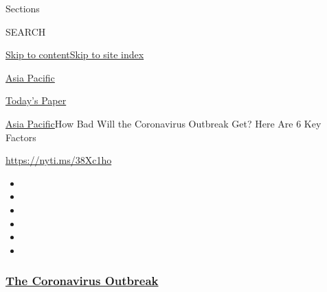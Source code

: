Sections

SEARCH

\protect\hyperlink{site-content}{Skip to
content}\protect\hyperlink{site-index}{Skip to site index}

\href{https://www.nytimes3xbfgragh.onion/section/world/asia}{Asia
Pacific}

\href{https://myaccount.nytimes3xbfgragh.onion/auth/login?response_type=cookie\&client_id=vi}{}

\href{https://www.nytimes3xbfgragh.onion/section/todayspaper}{Today's
Paper}

\href{/section/world/asia}{Asia Pacific}\textbar{}How Bad Will the
Coronavirus Outbreak Get? Here Are 6 Key Factors

\url{https://nyti.ms/38Xc1ho}

\begin{itemize}
\item
\item
\item
\item
\item
\item
\end{itemize}

\hypertarget{the-coronavirus-outbreak}{%
\subsubsection{\texorpdfstring{\href{https://www.nytimes3xbfgragh.onion/news-event/coronavirus?name=styln-coronavirus-national\&region=TOP_BANNER\&block=storyline_menu_recirc\&action=click\&pgtype=Interactive\&impression_id=953d71d0-f4c8-11ea-b924-e5b48aa72b34\&variant=undefined}{The
Coronavirus
Outbreak}}{The Coronavirus Outbreak}}\label{the-coronavirus-outbreak}}

